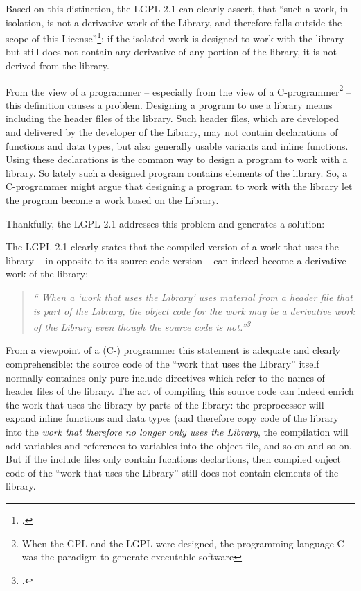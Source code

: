 Based on this distinction, the LGPL-2.1 can clearly assert, that \enquote{such
a work, in isolation, is not a derivative work of the Library, and therefore
falls outside the scope of this License}\footcite[cf.][\nopage wp
§5]{Lgpl21OsiLicense1999a}: if the isolated work is designed to work with the
library but still does not contain any derivative of any portion of the library,
it is not derived from the library.

From the view of a programmer -- especially from the view of a
C-programmer\footnote{When the GPL and the LGPL were designed, the programming
language C was the paradigm to generate executable software} -- this definition
causes a problem. Designing a program to use a library means including the
header files of the library. Such header files, which are developed and
delivered by the developer of the Library, may not contain declarations of
functions and data types, but also generally usable variants and inline
functions. Using these declarations is the common way to design a program to
work with a library. So lately such a designed program contains elements of the
library. So, a C-programmer might argue that designing a program to work with
the library let the program become a work based on the Library.

Thankfully, the LGPL-2.1 addresses this problem and generates a solution:

The LGPL-2.1 clearly states that the compiled version of a work that uses the
library -- in opposite to its source code version -- can indeed become a
derivative work of the library: 

\begin{quote}\emph{\enquote{ When a \enquote{work that uses the Library} uses
material from a header file that is part of the Library, the object code for the
work may be a derivative work of the Library even though the source code is
not.}\footcite[cf.][\nopage wp §5]{Lgpl21OsiLicense1999a} }
\end{quote}

From a viewpoint of a (C-) programmer this statement is adequate and clearly
comprehensible: the source code of the \enquote{work that uses the Library}
itself normally containes only pure include directives which refer to the names
of header files of the library. The act of compiling this source code can indeed 
enrich the work that uses the library by parts of the library: the preprocessor
will expand inline functions and data types (and therefore copy code of the
library into the \emph{work that therefore no longer only uses the Library}, the
compilation will add variables and references to variables into the object file,
and so on and so on. But if the include files only contain
fucntions declartions, then compiled onject code of the \enquote{work that uses
the Library} still does not contain elements of the library.

